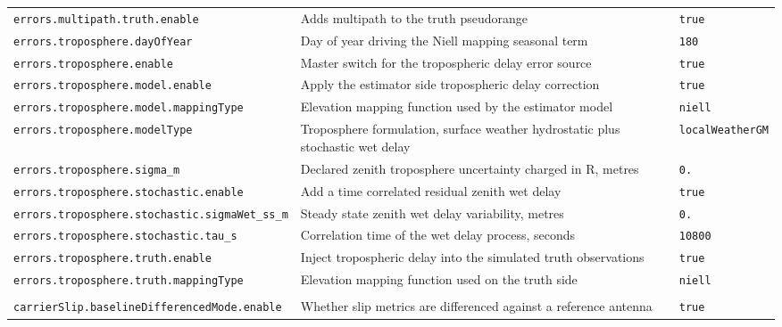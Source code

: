 \begin{center}
\begin{longtable}{>{\raggedright\arraybackslash\scriptsize\ttfamily}p{}|>{\raggedright\arraybackslash}p{}|>{\raggedright\arraybackslash\scriptsize\ttfamily}p{}}
\texttt{errors.\allowbreak multipath.\allowbreak truth.\allowbreak enable} & Adds multipath to the truth pseudorange & \texttt{true} \\
\texttt{errors.\allowbreak troposphere.\allowbreak day\allowbreak Of\allowbreak Year} & Day of year driving the Niell mapping seasonal term & \texttt{180} \\
\texttt{errors.\allowbreak troposphere.\allowbreak enable} & Master switch for the tropospheric delay error source & \texttt{true} \\
\texttt{errors.\allowbreak troposphere.\allowbreak model.\allowbreak enable} & Apply the estimator side tropospheric delay correction & \texttt{true} \\
\texttt{errors.\allowbreak troposphere.\allowbreak model.\allowbreak mapping\allowbreak Type} & Elevation mapping function used by the estimator model & \texttt{niell} \\
\texttt{errors.\allowbreak troposphere.\allowbreak model\allowbreak Type} & Troposphere formulation, surface weather hydrostatic plus stochastic wet delay & \texttt{local\allowbreak Weather\allowbreak GM} \\
\texttt{errors.\allowbreak troposphere.\allowbreak sigma\_\allowbreak m} & Declared zenith troposphere uncertainty charged in R, metres & \texttt{0.\allowbreak 15} \\
\texttt{errors.\allowbreak troposphere.\allowbreak stochastic.\allowbreak enable} & Add a time correlated residual zenith wet delay & \texttt{true} \\
\texttt{errors.\allowbreak troposphere.\allowbreak stochastic.\allowbreak sigma\allowbreak Wet\_\allowbreak ss\_\allowbreak m} & Steady state zenith wet delay variability, metres & \texttt{0.\allowbreak 04} \\
\texttt{errors.\allowbreak troposphere.\allowbreak stochastic.\allowbreak tau\_\allowbreak s} & Correlation time of the wet delay process, seconds & \texttt{10800} \\
\texttt{errors.\allowbreak troposphere.\allowbreak truth.\allowbreak enable} & Inject tropospheric delay into the simulated truth observations & \texttt{true} \\
\texttt{errors.\allowbreak troposphere.\allowbreak truth.\allowbreak mapping\allowbreak Type} & Elevation mapping function used on the truth side & \texttt{niell} \\
\hline
\multicolumn{3}{l}{\textbf{Measurements}} \\ \hline
\texttt{carrier\allowbreak Slip.\allowbreak baseline\allowbreak Differenced\allowbreak Mode.\allowbreak enable} & Whether slip metrics are differenced against a reference antenna & \texttt{true} \\

\end{longtable}
\end{center}

